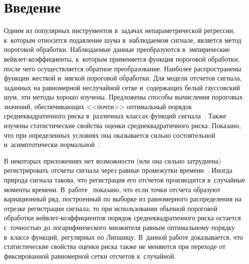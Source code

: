   



\thispagestyle{headings}

\begin{multicols}{2}

\label{st\stat}

\section{Введение}

Одним из популярных инструментов в~задачах непараметрической регрессии, 
к~которым относится подавление шума в~наблюдаемом сигнале, является метод 
пороговой обработки. Наблюдаемые данные преобразуются в~эмпирические 
вейв\-лет-ко\-эф\-фи\-ци\-ен\-ты, к~которым применяется функция пороговой обработки, 
после чего осуществляется обратное преобразование. Наиболее распространены функции 
жесткой и~мягкой пороговой обработки. Для модели отсчетов сигнала, заданных на 
равномерной неслучайной сетке и~содержащих белый гауссовский шум, эти методы 
хорошо изучены. Предложены способы вычисления пороговых значений,
 обеспечивающих <<почти>> оптимальный порядок среднеквадратичного риска 
 в~различных классах функций сигнала~\cite{DonJ94, DonJ95, MAJ98}. Также изучены 
 статистические свойства оценки среднеквадратичного риска. Показано, что при 
 определенных условиях она оказывается сильно состоятельной и~асимптотически 
 нормальной~\cite{Mar09, SH12, SH16-1, SH16-2}.

В некоторых приложениях нет возможности (или она сильно затруднена) 
регистрировать отсчеты сигнала через равные промежутки времени~\cite{CB98}. Иногда 
природа сигнала такова, что регистрация его отсчетов производится в~случайные 
моменты времени. В~работе~\cite{CB99} показано, что если точки отсчета образуют 
вариационный ряд, построенный по выборке из равномерного распределения на отрезке 
регистрации сигнала, то при использовании обычной пороговой обработки 
вейв\-лет-ко\-эф\-фи\-ци\-ен\-тов порядок среднеквадратичного риска остается 
с~точностью до логарифмического множителя равным оптимальному порядку в~классе 
функций, регулярных по Липшицу. В~данной работе доказывается, что статистические 
свойства оценки риска также не меняются при переходе от фиксированной равномерной 
сетки отсчетов к~случайной.

\vspace*{-5pt}


\end{multicols}
